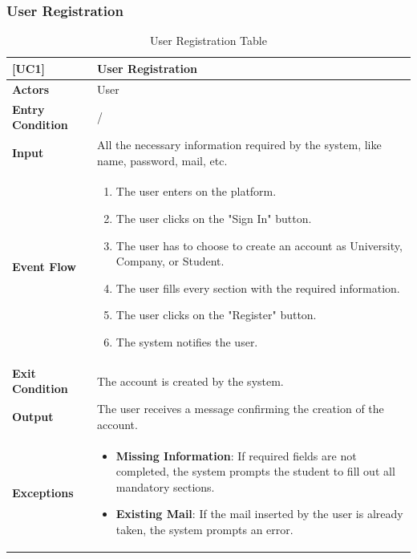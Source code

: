 \subsubsection*{User Registration}
\begin{table}[H]
    \centering
    \renewcommand{\arraystretch}{1.5}
    \begin{tabular}{|p{4cm}|p{11cm}|}
    \hline
    \rowcolor{bluepoli!40}
    \textbf{[UC1]} & \textbf{User Registration} \\ \hline \hline
    \textbf{Actors} & User \\ \hline
    \textbf{Entry Condition} & / \\ \hline
    \textbf{Input} & All the necessary information required by the system, like name, password, mail, etc. \\ \hline
    \textbf{Event Flow} & 
    {\setlength{\leftmargini}{1.4em}
    \begin{enumerate}
        \item The user enters on the platform.
        \item The user clicks on the "Sign In" button.
        \item The user has to choose to create an account as University, Company, or Student.
        \item The user fills every section with the required information.
        \item The user clicks on the "Register" button.
        \item The system notifies the user.
    \end{enumerate}} \\ \hline
    \textbf{Exit Condition} & The account is created by the system. \\ \hline
    \textbf{Output} & The user receives a message confirming the creation of the account. \\ \hline
    \textbf{Exceptions} & 
    {\setlength{\leftmargini}{1.1em}
    \begin{itemize}
        \item \textbf{Missing Information}: If required fields are not completed, the system prompts the student to fill out all mandatory sections.
        \item \textbf{Existing Mail}: If the mail inserted by the user is already taken, the system prompts an error.
    \end{itemize}} \\ \hline
    \end{tabular}
    \caption{User Registration Table}
\end{table}

